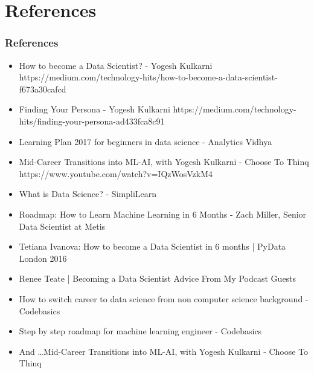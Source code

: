 \section[Refs]{References}

\begin{frame}[fragile]\frametitle{References}
\begin{itemize}
\item How to become a Data Scientist? - Yogesh Kulkarni https://medium.com/technology-hits/how-to-become-a-data-scientist-f673a30cafcd
\item Finding Your Persona - Yogesh Kulkarni https://medium.com/technology-hits/finding-your-persona-ad433fca8c91

\item Learning Plan 2017 for beginners in data science - Analytics Vidhya
\item Mid-Career Transitions into ML-AI, with Yogesh Kulkarni - Choose To Thinq https://www.youtube.com/watch?v=IQzWosVzkM4
\item What is Data Science? - SimpliLearn
\item Roadmap: How to Learn Machine Learning in 6 Months -  Zach Miller, Senior Data Scientist at Metis
\item Tetiana Ivanova: How to become a Data Scientist in 6 months | PyData London 2016
\item Renee Teate | Becoming a Data Scientist Advice From My Podcast Guests
\item How to switch career to data science from non computer science background - Codebasics
\item Step by step roadmap for machine learning engineer - Codebasics
\item And \ldots Mid-Career Transitions into ML-AI, with Yogesh Kulkarni - Choose To Thinq
\end{itemize}
\end{frame}

